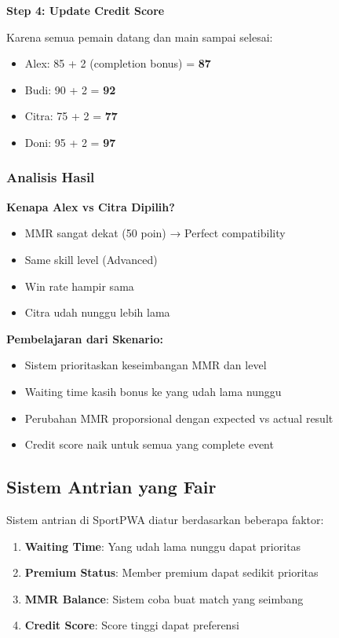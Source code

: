 \documentclass[12pt]{article}
\begin{document}
\textbf{Step 4: Update Credit Score}

Karena semua pemain datang dan main sampai selesai:
\begin{itemize}
    \item Alex: 85 + 2 (completion bonus) = \textbf{87}
    \item Budi: 90 + 2 = \textbf{92}
    \item Citra: 75 + 2 = \textbf{77}
    \item Doni: 95 + 2 = \textbf{97}
\end{itemize}

\subsubsection{Analisis Hasil}

\textbf{Kenapa Alex vs Citra Dipilih?}
\begin{itemize}
    \item MMR sangat dekat (50 poin) → Perfect compatibility
    \item Same skill level (Advanced)
    \item Win rate hampir sama
    \item Citra udah nunggu lebih lama
\end{itemize}

\textbf{Pembelajaran dari Skenario:}
\begin{itemize}
    \item Sistem prioritaskan keseimbangan MMR dan level
    \item Waiting time kasih bonus ke yang udah lama nunggu
    \item Perubahan MMR proporsional dengan expected vs actual result
    \item Credit score naik untuk semua yang complete event
\end{itemize}

\subsection{Sistem Antrian yang Fair}

Sistem antrian di SportPWA diatur berdasarkan beberapa faktor:

\begin{enumerate}
    \item \textbf{Waiting Time}: Yang udah lama nunggu dapat prioritas
    \item \textbf{Premium Status}: Member premium dapat sedikit prioritas
    \item \textbf{MMR Balance}: Sistem coba buat match yang seimbang
    \item \textbf{Credit Score}: Score tinggi dapat preferensi
\end{enumerate}
\end{document}
